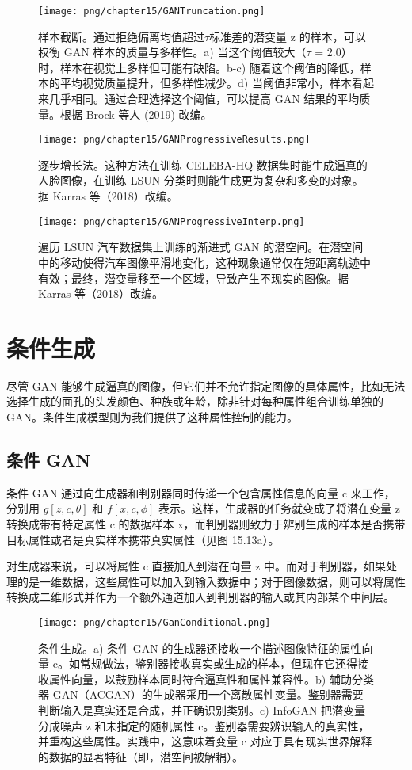 \begin{figure}[ht!]
\centering
\texttt{[image: png/chapter15/GANTruncation.png]}
\caption{样本截断。通过拒绝偏离均值超过\(\tau\)标准差的潜变量 z 的样本，可以权衡 GAN 样本的质量与多样性。a) 当这个阈值较大（\(\tau\) = 2.0）时，样本在视觉上多样但可能有缺陷。b-c) 随着这个阈值的降低，样本的平均视觉质量提升，但多样性减少。d) 当阈值非常小，样本看起来几乎相同。通过合理选择这个阈值，可以提高 GAN 结果的平均质量。根据 Brock 等人 (2019) 改编。}
\end{figure}


\begin{figure}[ht!]
\centering
\texttt{[image: png/chapter15/GANProgressiveResults.png]}
\caption{逐步增长法。这种方法在训练 CELEBA-HQ 数据集时能生成逼真的人脸图像，在训练 LSUN 分类时则能生成更为复杂和多变的对象。据 Karras 等（2018）改编。}
\end{figure}


\begin{figure}[ht!]
\centering
\texttt{[image: png/chapter15/GANProgressiveInterp.png]}
\caption{遍历 LSUN 汽车数据集上训练的渐进式 GAN 的潜空间。在潜空间中的移动使得汽车图像平滑地变化，这种现象通常仅在短距离轨迹中有效；最终，潜变量移至一个区域，导致产生不现实的图像。据 Karras 等（2018）改编。}
\end{figure}

\section{条件生成}
尽管 GAN 能够生成逼真的图像，但它们并不允许指定图像的具体属性，比如无法选择生成的面孔的头发颜色、种族或年龄，除非针对每种属性组合训练单独的 GAN。条件生成模型则为我们提供了这种属性控制的能力。
\subsection{条件 GAN}
条件 GAN 通过向生成器和判别器同时传递一个包含属性信息的向量 c 来工作，分别用 \(g[z, c, \theta]\) 和 \(f[x, c, \phi]\) 表示。这样，生成器的任务就变成了将潜在变量 z 转换成带有特定属性 c 的数据样本 x，而判别器则致力于辨别生成的样本是否携带目标属性或者是真实样本携带真实属性（见图 15.13a）。

对生成器来说，可以将属性 c 直接加入到潜在向量 z 中。而对于判别器，如果处理的是一维数据，这些属性可以加入到输入数据中；对于图像数据，则可以将属性转换成二维形式并作为一个额外通道加入到判别器的输入或其内部某个中间层。

\begin{figure}[ht!]
\centering
\texttt{[image: png/chapter15/GanConditional.png]}
\caption{条件生成。a) 条件 GAN 的生成器还接收一个描述图像特征的属性向量 c。如常规做法，鉴别器接收真实或生成的样本，但现在它还得接收属性向量，以鼓励样本同时符合逼真性和属性兼容性。b) 辅助分类器 GAN（ACGAN）的生成器采用一个离散属性变量。鉴别器需要判断输入是真实还是合成，并正确识别类别。c) InfoGAN 把潜变量分成噪声 z 和未指定的随机属性 c。鉴别器需要辨识输入的真实性，并重构这些属性。实践中，这意味着变量 c 对应于具有现实世界解释的数据的显著特征（即，潜空间被解耦）。}
\end{figure}

